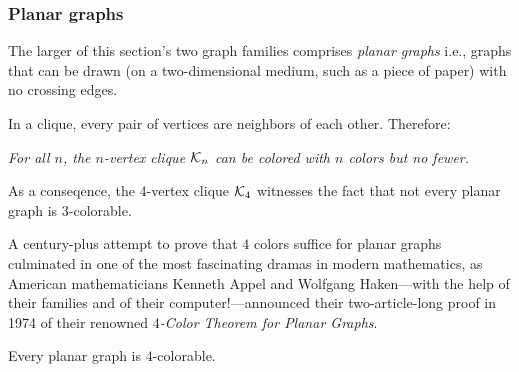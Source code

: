 \subsubsection{Planar graphs}
\label{sec:planar-graphs}

  
The larger of this section's two graph families comprises {\it planar graphs} i.e., graphs
that can be drawn (on a two-dimensional medium, such as a piece of
paper) with no crossing edges.

\bigskip

\noindent {}

\bigskip

\noindent
In a clique, every pair of vertices are neighbors of each other.  Therefore:

\smallskip

{\em For all $n$, the $n$-vertex clique $\mbox{$\cal K$}_n$ can be colored with $n$ colors but no fewer.}

\smallskip

\noindent
As a conseqence, the $4$-vertex clique $\mbox{$\cal K$}_4$ witnesses the fact that not every planar graph
is $3$-colorable.

\bigskip

  

\noindent
A century-plus attempt to prove that $4$ colors suffice for planar graphs culminated in one 
of the most fascinating dramas in modern mathematics, as American mathematicians
Kenneth Appel and Wolfgang Haken---with the help of their families and of their
computer!---announced their two-article-long proof in 1974 of their renowned
{\it $4$-Color Theorem for Planar Graphs}.  

\begin{theorem}
\label{thm:Four-ColorTheorem}
Every planar graph is $4$-colorable.
\end{theorem}


